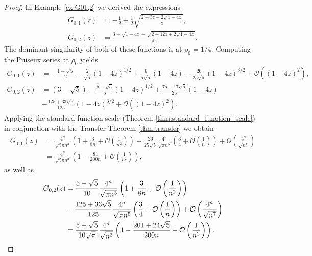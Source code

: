 \begin{proof}
  In Example \ref{ex:G01,2} we derived the expressions
  \begin{align*}
    G_{0,1}(z) &= -\frac{1}{2} + \frac{1}{2}\sqrt{\frac{2-3z-2\sqrt{1-4z}}{z}}, \\
    G_{0,2}(z) &= \frac{3 - \sqrt{1-4z} - \sqrt{2+12z+2\sqrt{1-4z}}}{4z}.
  \end{align*}
  The dominant singularity of both of these functions is at $\rho_{0} = 1/4$. Computing the Puiseux series at $\rho_0$ yields
  \begin{align*}
    G_{0,1}(z) &= - \frac{1-\sqrt{5}}{2} - \frac{2}{\sqrt{5}}(1-4z)^{1/2} + \frac{6}{5\sqrt{5}}(1-4z) - \frac{26}{25\sqrt{5}}(1-4z)^{3/2} + \mathcal{O}((1-4z)^{2}), \\
    G_{0,2}(z) &= \left(3 - \sqrt{5}\right) - \frac{5 + \sqrt{5}}{5}(1-4z)^{1/2} + \frac{75-17\sqrt{5}}{25}(1-4z) \\
    &- \frac{125 +  33\sqrt{5}}{125}(1 - 4z)^{3/2} + \mathcal{O}\left((1 - 4z)^2\right).
  \end{align*}
  Applying the standard function scale (Theorem \ref{thm:standard_function_scale}) in conjunction with the Transfer Theorem \ref{thm:transfer} we obtain
  \begin{align*}
    [z^{n}]G_{0,1}(z) &= \frac{4^{n}}{\sqrt{5\pi n^{3}}}
    \left(
      1 + \frac{3}{8n} + 
      \mathcal{O}\left(\frac{1}{n^{2}}\right)
    \right) - 
    \frac{26}{25\sqrt{5}}\frac{4^{n}}{\sqrt{\pi n^{5}}}
    \left(
      \frac{3}{4} + \mathcal{O}\left(\frac{1}{n}\right)
    \right) + 
    \mathcal{O}\left(\frac{4^{n}}{\sqrt{n^{7}}}\right) \\
    &= \frac{4^{n}}{\sqrt{5\pi n^{3}}}
    \left(
      1 - \frac{81}{200n} + 
      \mathcal{O}\left(\frac{1}{n^{2}}\right)
    \right),
  \end{align*}
  as well as
  \begin{align*}
    [z^{n}]G_{0,2}(z) &= \frac{5 + \sqrt{5}}{10}\frac{4^{n}}{\sqrt{\pi n^{3}}}
    \left(
      1 + \frac{3}{8n} + 
      \mathcal{O}\left(\frac{1}{n^{2}}\right)
    \right) \\
    &-
    \frac{125 + 33\sqrt{5}}{125}\frac{4^{n}}{\sqrt{\pi n^{5}}}
    \left(
      \frac{3}{4} + \mathcal{O}\left(\frac{1}{n}\right)
    \right) +
    \mathcal{O}\left(\frac{4^{n}}{\sqrt{n^{7}}}\right) \\
    &= \frac{5 + \sqrt{5}}{10\sqrt{\pi}}\frac{4^n}{\sqrt{n^3}}
    \left(
      1 - \frac{201 + 24\sqrt{5}}{200n} + \mathcal{O}\left(\frac{1}{n^2}\right)
    \right). \qedhere
  \end{align*}
\end{proof}

